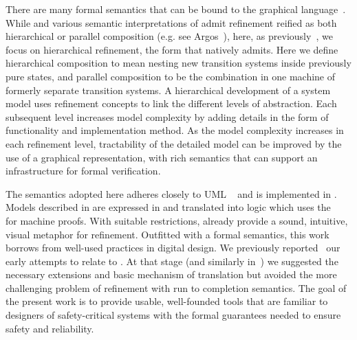 There are many formal semantics that can be bound to 
 the \Statechart graphical language~\cite{Eshuis_2009}. While \Statecharts and various semantic interpretations of
\Statecharts admit refinement reified as both hierarchical or parallel
composition (e.g. see Argos~\cite{Maraninchi91theargos}), here, as
previously~\cite{snook14:_b_statem}, we focus on hierarchical
refinement, the form that \EventB natively admits.  Here we define
hierarchical composition to mean nesting new transition systems inside
previously pure states, and parallel composition to be the combination
in one machine of formerly separate transition systems.
A hierarchical development of a system model uses refinement
concepts to link the different levels of abstraction. Each subsequent
level increases model complexity by adding details in the form of
functionality and implementation method. As the model complexity
increases in each refinement level, tractability of the detailed model
can be improved by the use of a graphical representation, with rich
semantics that can support an infrastructure for formal verification.


The semantics adopted here adheres closely to UML \Statecharts~\cite{Alexandre} and is implemented in \iUMLB.
Models described in \Statecharts are expressed in \SCXML and translated into \EventB logic which uses the \Rodin~\cite{abrial10:_rodin} for machine proofs.
With suitable restrictions, \Statecharts already provide a sound, intuitive, visual metaphor for refinement. 
Outfitted with a formal semantics, this work borrows from well-used \Statechart practices in digital design.  
We previously reported~\cite{Morris_2016} our early attempts to relate \Statecharts to \EventB. 
At that stage (and similarly in\mbox{~\cite{Snook12:FMCO}}) we suggested the necessary extensions and basic mechanism of translation but avoided the more challenging problem of refinement with run to completion semantics. 
The goal of the present work is to provide usable, well-founded tools that are familiar to designers of safety-critical systems with the formal guarantees needed to ensure safety and reliability.


